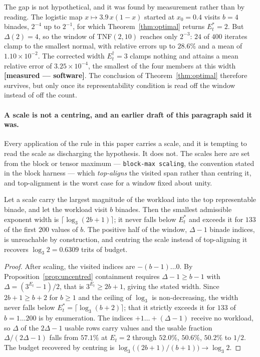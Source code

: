 The gap is not hypothetical, and it was found by measurement rather than by
reading. The logistic map $x \mapsto 3.9\,x(1-x)$ started at $x_0 = 0.4$ visits
$b=4$ binades, $2^{-4}$ up to $2^{-1}$, for which Theorem~\ref{thm:optimal}
returns $E_t^{*}=2$. But $\Delta(2)=4$, so the window of TNF$(2,10)$ reaches only
$2^{-3}$: $24$ of $400$ iterates clamp to the smallest normal, with relative
errors up to $28.6\%$ and a mean of $1.10\times10^{-2}$. The corrected width
$E_t^{\dagger}=3$ clamps nothing and attains a mean relative error of
$3.25\times10^{-4}$, the smallest of the four members at this width
\textbf{[measured --- software]}. The conclusion of Theorem~\ref{thm:optimal}
therefore survives, but only once its representability condition is read off the
window instead of off the count.

\paragraph{A scale is not a centring, and an earlier draft of this paragraph said
it was.} Every application of the rule in this paper carries a scale, and it is
tempting to read the scale as discharging the hypothesis. It does not. The scales
here are set from the block or tensor maximum --- \texttt{block-max scaling}, the
convention stated in the block harness --- which \emph{top-aligns} the visited
span rather than centring it, and top-alignment is the worst case for a window
fixed about unity.

\begin{corollary}
\label{cor:topaligned}
Let a scale carry the largest magnitude of the workload into the top representable
binade, and let the workload visit $b$ binades. Then the smallest admissible
exponent width is $\lceil \log_3(2b+1) \rceil$; it never falls below $E_t^{*}$ and
exceeds it for $133$ of the first $200$ values of $b$. The positive half of the
window, $\Delta-1$ binade indices, is unreachable by construction, and centring
the scale instead of top-aligning it recovers $\log_3 2 = 0.6309$ trits of budget.
\end{corollary}

\begin{proof}
After scaling, the visited indices are $-(b-1) \ldots 0$. By
Proposition~\ref{prop:uncentred} containment requires $\Delta - 1 \ge b-1$ with
$\Delta = (3^{E_t}-1)/2$, that is $3^{E_t} \ge 2b+1$, giving the stated width.
Since $2b+1 \ge b+2$ for $b \ge 1$ and the ceiling of $\log_3$ is non-decreasing,
the width never falls below $E_t^{*} = \lceil\log_3(b+2)\rceil$; that it strictly
exceeds it for $133$ of $b = 1 \ldots 200$ is by enumeration. The indices
$+1 \ldots +(\Delta-1)$ receive no workload, so $\Delta$ of the $2\Delta-1$ usable
rows carry values and the usable fraction $\Delta/(2\Delta-1)$ falls from
$57.1\%$ at $E_t=2$ through $52.0\%$, $50.6\%$, $50.2\%$ to $1/2$. The budget
recovered by centring is $\log_3\bigl((2b+1)/(b+1)\bigr) \to \log_3 2$.
\end{proof}

